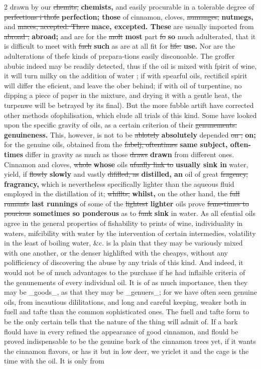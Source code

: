 \documentclass[10pt]{article}
\begin{document}
\begin{multicols}{2}
drawn by our \sout{chemits,} \textbf{chemists,} and easily procurable in a tolerable degree of \sout{perfections i thofe} \textbf{perfection; those} of cinnamon, cloves, \sout{numanges,} \textbf{nutmegs,} and \sout{maces, accepted. There} \textbf{mace, excepted. These} are usually imported from \sout{abroad ;} \textbf{abroad;} and are for the \sout{molt} \textbf{most} part \sout{fo} \textbf{so} much adulterated, that it is difficult to meet with \sout{fuch} \textbf{such} as are at all fit for \sout{life.} \textbf{use.} Nor are the adulterations of thefe kinds of prepara-tions easily disconoable. The groffer abubic indeed may be readily detected, thus if the oil is mixed with fpirit of wine, it will turn milky on the addition of water ; if with spearful oils, rectificil spirit will differ the eficient, and leave the ober behind; if with oil of turpentine, no dipping a piece of paper in the mixture, and drying it with a gentle heat, the turpenwe will be betrayed by its final). But the more fubble artift have corrected other methods ofophilisation, which elude all trials of this kind. Some have looked upon the specific gravity of oils, as a certain criterion of their \sout{genunements.} \textbf{genuineness.} This, however, is not to be \sout{ablotely} \textbf{absolutely} depended \sout{on ;} \textbf{on;} for the genuine oils, obtained from the \sout{fabelj, oftentimes} \textbf{same subject, often-times} differ in gravity as much as those \sout{draws} \textbf{drawn} from different ones. Cinnamon and cloves, \sout{whole} \textbf{whose} oils \sout{ufually link to} \textbf{usually sink in} water, yield, if \sout{flowly} \textbf{slowly} and vastly \sout{difilled, as} \textbf{distilled, an} oil of great \sout{fragency,} \textbf{fragrancy,} which is nevertheless specifically lighter than the aqueous fluid employed in the distillation of it; \sout{whillts,} \textbf{whilst,} on the other hand, the \sout{full rumants} \textbf{last runnings} of some of the \sout{lightest} \textbf{lighter} oils prove \sout{feme-times to poucious} \textbf{sometimes so ponderous} as to \sout{funk} \textbf{sink} in water. As all efential oils agree in the general properties of fishability to prints of wine, individuality in waters, mifcibility with water by the intervention of certain intermedies, volatility in the least of boiling water, \&c. is la plain that they may be variously mixed with one another, or the denser highlifted with the cheapys, without any polifficiency of discovering the abuse by any trials of this kind. And indeed, it would not be of much advantages to the purchase if he had inflaible criteria of the genunements of every individual oil. It is of as much importance, then they may be \_goods\_, as that they may be \_genuers\_; for we have often seen genuine oils, from incautious dililitations, and long and careful keeping, weaker both in fuell and tafte than the common sophisticated ones. The fuell and tafte form to be the only certain tells that the nature of the thing will admit of. If a bark flould have in every refined the appearance of good cinnamon, and flould be proved indispensable to be the genuine bark of the cinnamon trees yet, if it wants the cinnamon flavors, or has it but in low deer, we yriclet it and the cage is the time with the oil. It is only from 
\end{multicols}
\end{document}
